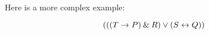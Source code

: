 \begin{comment}
Consider this sentence: 
\begin{earg}
\item[] {Dr. Wilson is in his  office, and if she is teaching today, then Dr. Cook is in her office}. 
\end{earg}
This sentence contains two logical operators, `and' and `if \ldots, then\ldots', and one of them is the \define{main logical operator} of the sentence. The main logical operator determines, at the most general level, what kind of sentence it is---a conjunction, a disjunction, a conditional, a biconditional, or a negation. The sentence above is a conjunction. Thus, the `and' is the main logic operator, and these are the two conjuncts: 
\begin{earg}
\item[1.] {Dr. Wilson is in his office}.
\item[2.] {If she is teaching today, then Dr. Cook is in her office}. 
\end{earg}
The second conjunct is a conditional, but the \textit{if\ldots, then\ldots} only applies to \textit{she is teaching today} and \textit{Dr. Cook is in her office}, not to the whole sentence. 

Now let's look at this sentence: 
\begin{ebullet}
	\item[] {If today is not Saturday, then Amy is at work and Kate is at school}. 
\end{ebullet}
	
\noindent This is a conditional. The antecedent is \textit{today is not Saturday}, and the consequent is \textit{Amy is at work and Kate is at school}. So, although there are three logical operators in this sentence, the main one is the \textit{if ..., then ...} (and so if we translated this sentence into TFL, the main logical operator would be the `$\eif$'). 

Even though the sentence is a conditional, the \textit{not} and the \textit{and} each have a role. But their roles are limited to only a part of the sentence. Take the \textit{not}. It applies to (i.e., negates) \textit{today is Saturday}.  
The \textit{and}'s job, meanwhile, is to create a conjunction by joining \textit{Amy is at work} and \textit{Kate is at school}. 
\end{comment}

Here is a more complex example:

$$(((T \rightarrow P) \mathbin{\&} R) \vee (S \leftrightarrow Q))$$

